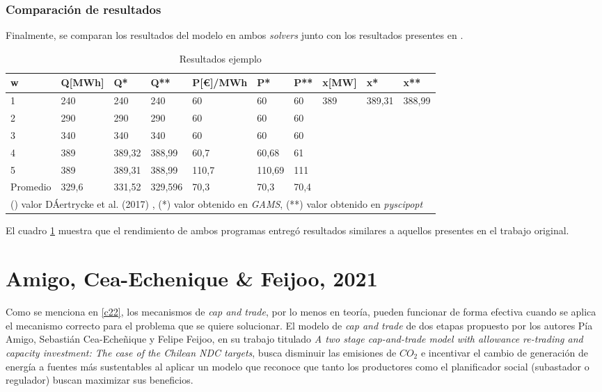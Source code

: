 \subsubsection{Comparación de resultados}
Finalmente, se comparan los resultados del modelo en ambos \textit{solvers} junto con los resultados presentes en .

\begin{table}[H]
\centering
\begin{tabular}{|l|l|l|l|l|l|l|l|l|l|}
\hline
w & Q{[}MWh{]} & Q* & Q** & P{[\textup{\euro}]/MWh} & P* & P** & x{[}MW{]} & x* & x** \\ \hline
1 & 240 & 240 & 240 & 60 & 60 & 60 & 389 & 389,31 & 388,99 \\ \hline
2 & 290 & 290 & 290 & 60 & 60 & 60 &  &  &  \\ \hline
3 & 340 & 340 & 340 & 60 & 60 & 60 &  &  &  \\ \hline
4 & 389 & 389,32 & 388,99 & 60,7 & 60,68 & 61 &  &  &  \\ \hline
5 & 389 & 389,31 & 388,99 & 110,7 & 110,69 & 111 &  &  &  \\ \hline
Promedio & 329,6 & 331,52 & 329,596 & 70,3 & 70,3 & 70,4 &  &  &  \\ \hline
\multicolumn{10}{l}{\footnotesize () valor  DÁertrycke et al. (2017) , (*) valor obtenido en \textit{GAMS}, (**) valor obtenido en \textit{pyscipopt}}\\
\end{tabular}
\caption{Resultados ejemplo}
\label{tabla:ejemplos}
\end{table}

El cuadro \ref{tabla:ejemplos} muestra que el rendimiento de ambos programas entregó resultados similares a aquellos presentes en el trabajo original.



\section{Amigo, Cea-Echenique \& Feijoo, 2021}

Como se menciona en \ref{c22}, los mecanismos de \textit{cap and trade}, por lo menos en teoría, pueden funcionar de forma efectiva cuando se aplica el mecanismo correcto para el problema que se quiere solucionar. El modelo de \textit{cap and trade} de dos etapas propuesto por los autores Pía Amigo, Sebastián Cea-Echeñique y Felipe Feijoo, en su trabajo titulado \textit{A two stage cap-and-trade model with allowance re-trading and capacity investment: The case of the Chilean NDC targets}, busca disminuir las emisiones de $CO_2$ e incentivar el cambio de generación de energía a fuentes más sustentables al aplicar un modelo que reconoce que tanto los productores como el planificador social (subastador o regulador) buscan maximizar sus beneficios.
\vspace{2.5mm}

